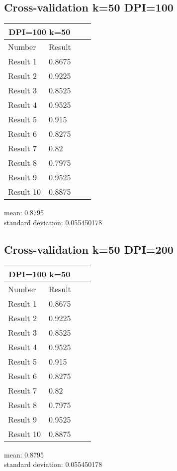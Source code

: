 \documentclass[paper=a4, fontsize=11pt]{scrartcl} %
\numberwithin{equation}{section} %
\numberwithin{figure}{section} %
\numberwithin{table}{section} %
\begin{document}
\subsection*{Cross-validation k=50 DPI=100}
\begin{center}
\begin{tabular}{ |p{3cm}|p{3cm}|p{3cm}|p{3cm}|  }
 \hline
 \multicolumn{2}{|c|}{DPI=100 k=50} \\
 \hline
 Number & Result\\
 \hline
 Result 1 & 0.8675 \\
 Result 2 & 0.9225 \\
 Result 3 & 0.8525 \\
 Result 4 & 0.9525\\ 
 Result 5 & 0.915 \\
 Result 6 & 0.8275 \\
 Result 7 & 0.82 \\
 Result 8 & 0.7975 \\
 Result 9 & 0.9525 \\
 Result 10 & 0.8875\\
 \hline
\end{tabular}
\end{center}
\begin{center}
mean: 0.8795\\
standard deviation: 0.055450178\\
\end{center}

\subsection*{Cross-validation k=50 DPI=200}
\begin{center}
\begin{tabular}{ |p{3cm}|p{3cm}|p{3cm}|p{3cm}|  }
 \hline
 \multicolumn{2}{|c|}{DPI=100 k=50} \\
 \hline
 Number & Result\\
 \hline
 Result 1 & 0.8675 \\
 Result 2 & 0.9225 \\
 Result 3 & 0.8525 \\
 Result 4 & 0.9525\\ 
 Result 5 & 0.915 \\
 Result 6 & 0.8275 \\
 Result 7 & 0.82 \\
 Result 8 & 0.7975 \\
 Result 9 & 0.9525 \\
 Result 10 & 0.8875\\
 \hline
\end{tabular}
\end{center}
\begin{center}
mean: 0.8795\\
standard deviation: 0.055450178\\
\end{center}
\end{document}
